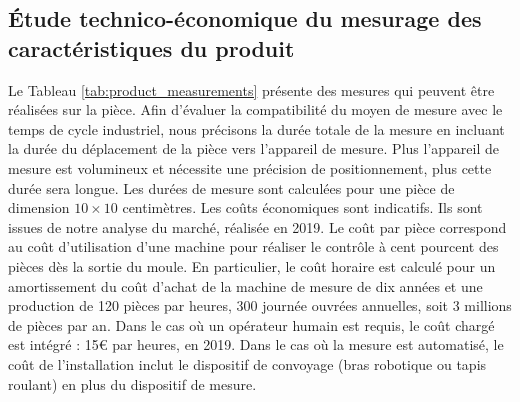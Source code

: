 \subsection{Étude technico-économique du mesurage des caractéristiques du produit}
Le Tableau \ref{tab:product_measurements} présente des mesures qui peuvent être réalisées sur la pièce.
Afin d'évaluer la compatibilité du moyen de mesure avec le temps de cycle industriel, nous précisons la durée totale de la mesure en incluant la durée du déplacement de la pièce vers l'appareil de mesure.
Plus l'appareil de mesure est volumineux et nécessite une précision de positionnement, plus cette durée sera longue.
Les durées de mesure sont calculées pour une pièce de dimension $10 \times 10$ centimètres.
Les coûts économiques sont indicatifs.
Ils sont issues de notre analyse du marché, réalisée en 2019.
Le coût par pièce correspond au coût d'utilisation d'une machine pour réaliser le contrôle à cent pourcent des pièces dès la sortie du moule.
En particulier, le coût horaire est calculé pour un amortissement du coût d'achat de la machine de mesure de dix années et une production de 120 pièces par heures, 300 journée ouvrées annuelles, soit 3 millions de pièces par an.
Dans le cas où un opérateur humain est requis, le coût chargé est intégré : 15€ par heures, en 2019.
Dans le cas où la mesure est automatisé, le coût de l'installation inclut le dispositif de convoyage (bras robotique ou tapis roulant) en plus du dispositif de mesure.

